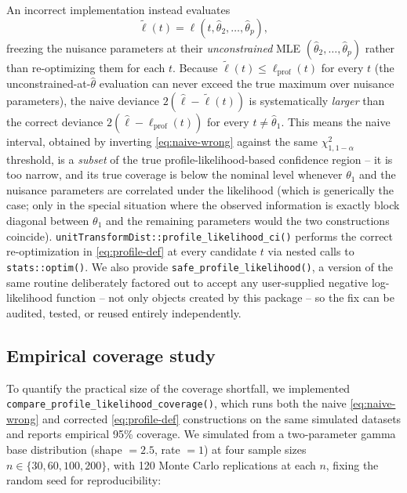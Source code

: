 An incorrect implementation instead evaluates
\begin{equation}
  \tilde\ell(t) = \ell(t,\hat\theta_2,\dots,\hat\theta_p),
  \label{eq:naive-wrong}
\end{equation}
freezing the nuisance parameters at their \emph{unconstrained} MLE
$(\hat\theta_2,\dots,\hat\theta_p)$ rather than re-optimizing them for
each $t$. Because $\tilde\ell(t) \le \ell_{\mathrm{prof}}(t)$ for every
$t$ (the unconstrained-at-$\hat\theta$ evaluation can never exceed the
true maximum over nuisance parameters), the naive deviance
$2(\hat\ell-\tilde\ell(t))$ is systematically \emph{larger} than the
correct deviance $2(\hat\ell-\ell_{\mathrm{prof}}(t))$ for every $t \ne
\hat\theta_1$. This means the naive interval, obtained by inverting
\eqref{eq:naive-wrong} against the same $\chi^2_{1,1-\alpha}$ threshold,
is a \emph{subset} of the true profile-likelihood-based confidence
region -- it is too narrow, and its true coverage is below the nominal
level whenever $\theta_1$ and the nuisance parameters are correlated
under the likelihood (which is generically the case; only in the
special situation where the observed information is exactly block
diagonal between $\theta_1$ and the remaining parameters would the two
constructions coincide). \texttt{unitTransformDist::profile\_likelihood\_ci()}
performs the correct re-optimization in \eqref{eq:profile-def} at every
candidate $t$ via nested calls to \texttt{stats::optim()}. We also
provide \texttt{safe\_profile\_likelihood()}, a version of the same
routine deliberately factored out to accept any user-supplied negative
log-likelihood function -- not only objects created by this package --
so the fix can be audited, tested, or reused entirely independently.

\subsection{Empirical coverage study}

To quantify the practical size of the coverage shortfall, we implemented
\texttt{compare\_profile\_likelihood\_coverage()}, which runs both the
naive \eqref{eq:naive-wrong} and corrected \eqref{eq:profile-def}
constructions on the same simulated datasets and reports empirical 95\%
coverage. We simulated from a two-parameter gamma base distribution
(shape $=2.5$, rate $=1$) at four sample sizes $n \in \{30,60,100,200\}$,
with 120 Monte Carlo replications at each $n$, fixing the random seed
for reproducibility:

